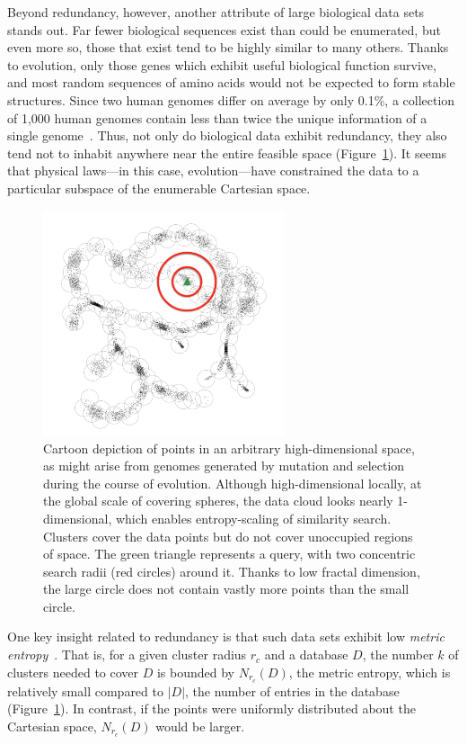 \documentclass{acm_proc_article-sp}
\begin{document}
Beyond redundancy, however, another attribute of large biological data sets
stands out.
Far fewer biological sequences exist than could be enumerated, but even more so, those that exist tend to be highly similar to many others.
Thanks to 
evolution, only those genes
which exhibit useful biological function survive, and most
random sequences of amino acids would not be expected to form stable structures.
Since two human genomes differ on average by only 0.1\%, a collection of 1,000 human genomes contain less than twice the unique information of a single genome~\cite{loh2012compressive}.
Thus, not only do biological data exhibit redundancy, they also tend not to 
inhabit anywhere near the entire feasible space (Figure~\ref{fig:dataspace}).
It seems that physical laws---in this case, evolution---have constrained the data to a particular subspace of the enumerable Cartesian space.

\begin{figure}[htb!]
\centering
\includegraphics[width=2.8in]{assets/treepoints-fractal.png}
\caption{Cartoon depiction of points in an arbitrary high-dimensional space, 
as might arise from genomes generated by mutation and selection during the 
course of evolution. 
Although high-dimensional locally, at the global scale of covering spheres, the 
data cloud looks nearly 1-dimensional, which enables entropy-scaling of 
similarity search. Clusters cover the data points but do not cover unoccupied 
regions of space.
The green triangle represents a query, with two concentric search radii (red 
circles) around it. Thanks to low fractal dimension, the large circle does
not contain vastly more points than the small circle.}
\label{fig:dataspace}
\end{figure}

One key insight related to redundancy
is that such data sets exhibit
low \emph{metric entropy}~\cite{yu2015entropy}.
That is, for a given cluster radius $r_c$ and a database $D$, the number $k$ 
of clusters needed to cover $D$ is bounded by $N_{r_c} (D)$, the metric 
entropy, which is relatively small compared to
$|D|$, the number of entries in the database (Figure~\ref{fig:dataspace}).
In contrast, if the points were uniformly distributed about the Cartesian space,
$N_{r_c} (D)$ would be larger.
\end{document}
